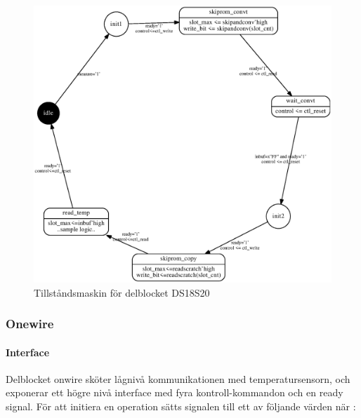 \begin{figure}[H]
	\centering
	\includegraphics[width=\textwidth]{ds18s20_fsm.eps}
	\caption{Tillståndsmaskin för delblocket DS18S20}
	\label{fig:ds18s20_fsm}
\end{figure}



\subsubsection{Onewire}\label{sec:onewire}
\paragraph{Interface}
Delblocket onwire sköter lågnivå kommunikationen med temperatursensorn, och exponerar ett högre nivå interface med fyra kontroll-kommandon och en ready signal. För att initiera en operation sätts  signalen till ett av följande värden när :

